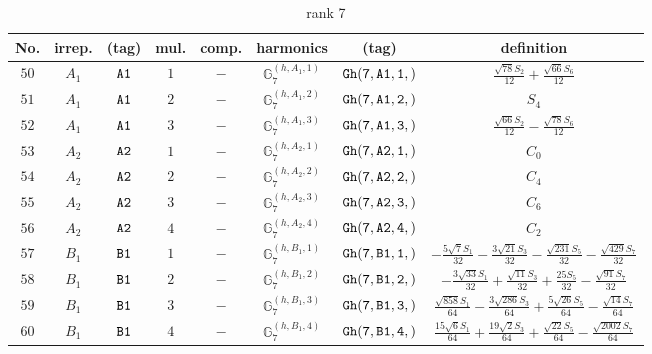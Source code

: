 \documentclass[fleqn,8pt]{jsarticle}
\begin{document}
\begin{table}[ht!]
\begin{center}
\caption{rank 7}
\renewcommand{\arraystretch}{1.3}
\begin{tabular}{cccccccc} \hline \hline
No. & irrep. & (tag) & mul. & comp. & harmonics & (tag) & definition \\ \hline
$ 50 $ & $ A_{1} $ & $ {\tt A1} $ & $ 1 $ & $ - $ & $ \mathbb{G}_{7}^{(h,A_{1},1)} $ & $ {\tt Gh(7,A1,1,)} $ & $ \frac{\sqrt{78} S_{2}}{12} + \frac{\sqrt{66} S_{6}}{12} $ \\
$ 51 $ & $ A_{1} $ & $ {\tt A1} $ & $ 2 $ & $ - $ & $ \mathbb{G}_{7}^{(h,A_{1},2)} $ & $ {\tt Gh(7,A1,2,)} $ & $ S_{4} $ \\
$ 52 $ & $ A_{1} $ & $ {\tt A1} $ & $ 3 $ & $ - $ & $ \mathbb{G}_{7}^{(h,A_{1},3)} $ & $ {\tt Gh(7,A1,3,)} $ & $ \frac{\sqrt{66} S_{2}}{12} - \frac{\sqrt{78} S_{6}}{12} $ \\
$ 53 $ & $ A_{2} $ & $ {\tt A2} $ & $ 1 $ & $ - $ & $ \mathbb{G}_{7}^{(h,A_{2},1)} $ & $ {\tt Gh(7,A2,1,)} $ & $ C_{0} $ \\
$ 54 $ & $ A_{2} $ & $ {\tt A2} $ & $ 2 $ & $ - $ & $ \mathbb{G}_{7}^{(h,A_{2},2)} $ & $ {\tt Gh(7,A2,2,)} $ & $ C_{4} $ \\
$ 55 $ & $ A_{2} $ & $ {\tt A2} $ & $ 3 $ & $ - $ & $ \mathbb{G}_{7}^{(h,A_{2},3)} $ & $ {\tt Gh(7,A2,3,)} $ & $ C_{6} $ \\
$ 56 $ & $ A_{2} $ & $ {\tt A2} $ & $ 4 $ & $ - $ & $ \mathbb{G}_{7}^{(h,A_{2},4)} $ & $ {\tt Gh(7,A2,4,)} $ & $ C_{2} $ \\
$ 57 $ & $ B_{1} $ & $ {\tt B1} $ & $ 1 $ & $ - $ & $ \mathbb{G}_{7}^{(h,B_{1},1)} $ & $ {\tt Gh(7,B1,1,)} $ & $ - \frac{5 \sqrt{7} S_{1}}{32} - \frac{3 \sqrt{21} S_{3}}{32} - \frac{\sqrt{231} S_{5}}{32} - \frac{\sqrt{429} S_{7}}{32} $ \\
$ 58 $ & $ B_{1} $ & $ {\tt B1} $ & $ 2 $ & $ - $ & $ \mathbb{G}_{7}^{(h,B_{1},2)} $ & $ {\tt Gh(7,B1,2,)} $ & $ - \frac{3 \sqrt{33} S_{1}}{32} + \frac{\sqrt{11} S_{3}}{32} + \frac{25 S_{5}}{32} - \frac{\sqrt{91} S_{7}}{32} $ \\
$ 59 $ & $ B_{1} $ & $ {\tt B1} $ & $ 3 $ & $ - $ & $ \mathbb{G}_{7}^{(h,B_{1},3)} $ & $ {\tt Gh(7,B1,3,)} $ & $ \frac{\sqrt{858} S_{1}}{64} - \frac{3 \sqrt{286} S_{3}}{64} + \frac{5 \sqrt{26} S_{5}}{64} - \frac{\sqrt{14} S_{7}}{64} $ \\
$ 60 $ & $ B_{1} $ & $ {\tt B1} $ & $ 4 $ & $ - $ & $ \mathbb{G}_{7}^{(h,B_{1},4)} $ & $ {\tt Gh(7,B1,4,)} $ & $ \frac{15 \sqrt{6} S_{1}}{64} + \frac{19 \sqrt{2} S_{3}}{64} + \frac{\sqrt{22} S_{5}}{64} - \frac{\sqrt{2002} S_{7}}{64} $ \\

\end{tabular}
\end{center}
\end{table}
\end{document}
